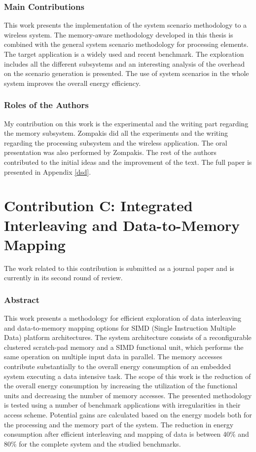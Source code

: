 \subsubsection{Main Contributions}

This work presents the implementation of the system scenario methodology to a wireless system.
The memory-aware methodology developed in this thesis is combined with the general system scenario methodology for processing elements.
The target application is a widely used and recent benchmark.
The exploration includes all the different subsystems and an interesting analysis of the overhead on the scenario generation is presented.
The use of system scenarios in the whole system improves the overall energy efficiency.

\subsubsection{Roles of the Authors}

My contribution on this work is the experimental and the writing part regarding the memory subsystem.
Zompakis did all the experiments and the writing regarding the processing subsystem and the wireless application.
The oral presentation was also performed by Zompakis.
The rest of the authors contributed to the initial ideas and the improvement of the text.
The full paper is presented in Appendix \ref{dsd}.

\section{Contribution C: Integrated Interleaving and Data-to-Memory Mapping}

The work related to this contribution is submitted as a journal paper and is currently in its second round of review.

\subsubsection{Abstract}

This work presents a methodology for efficient exploration of data interleaving and data-to-memory mapping options for SIMD (Single Instruction Multiple Data) platform architectures.
The system architecture consists of  a reconfigurable clustered scratch-pad memory and a SIMD functional unit, which performs the same operation on multiple input data in parallel. 
The memory accesses contribute substantially to the overall energy consumption of an embedded system executing a data intensive task. 
The scope of this work is the reduction of the overall energy consumption by increasing the utilization of the functional units and decreasing the number of memory accesses.
The presented methodology is tested using a number of benchmark applications with irregularities in their access scheme.
Potential gains are calculated based on the energy models both for the processing and the memory part of the system.
The reduction in energy consumption after efficient interleaving and mapping of data is between 40\% and 80\% for the complete system and the studied benchmarks.

